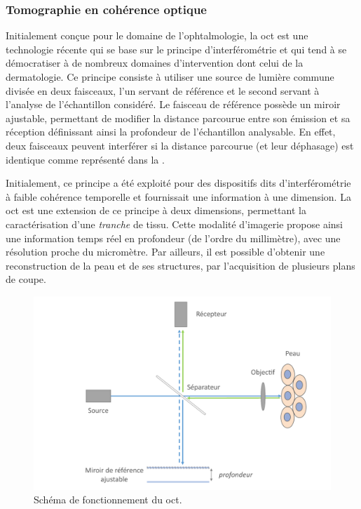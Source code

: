\subsubsection{Tomographie en cohérence optique}
Initialement conçue pour le domaine de l’ophtalmologie, la \gls{oct} est une technologie récente qui se base sur le principe d’interférométrie et qui tend à se démocratiser à de nombreux domaines d’intervention dont celui de la dermatologie. Ce principe consiste à utiliser une source de lumière commune divisée en deux faisceaux, l’un servant de référence et le second servant à l’analyse de l’échantillon considéré. Le faisceau de référence possède un miroir ajustable, permettant de modifier la distance parcourue entre son émission et sa réception définissant ainsi la profondeur de l’échantillon analysable. En effet, deux faisceaux peuvent interférer si la distance parcourue (et leur déphasage) est identique comme représenté dans la .\par

Initialement, ce principe a été exploité pour des dispositifs dits d’interférométrie à faible cohérence temporelle et fournissait une information à une dimension. La \gls{oct} est une extension de ce principe à deux dimensions, permettant la caractérisation d’une \textit{tranche} de tissu. Cette modalité d’imagerie propose ainsi une information temps réel en profondeur (de l’ordre du millimètre), avec une résolution proche du micromètre. Par ailleurs, il est possible d'obtenir une reconstruction de la peau et de ses structures, par l'acquisition de plusieurs plans de coupe.\par

\begin{figure}[H]
    \centering
    \includegraphics[width=1\linewidth]{contents/chapter_2/resources/scheme_principle_oct.pdf}
    \caption{Schéma de fonctionnement du \gls{oct}.}
    \label{fig:scheme_principle_oct}
\end{figure}\par
\clearpage

